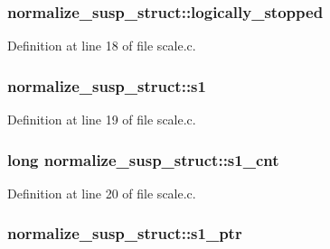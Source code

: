 \subsubsection[{\texorpdfstring{logically\+\_\+stopped}{logically_stopped}}]{ normalize\+\_\+susp\+\_\+struct\+::logically\+\_\+stopped}\hypertarget{structnormalize__susp__struct_a1fe93aa176088fc7f5640f7c9835ea21}{}\label{structnormalize__susp__struct_a1fe93aa176088fc7f5640f7c9835ea21}


Definition at line 18 of file scale.\+c.

\subsubsection[{\texorpdfstring{s1}{s1}}]{ normalize\+\_\+susp\+\_\+struct\+::s1}\hypertarget{structnormalize__susp__struct_a11fb76b27a21d4e4a1752974128351c4}{}\label{structnormalize__susp__struct_a11fb76b27a21d4e4a1752974128351c4}


Definition at line 19 of file scale.\+c.

\subsubsection[{\texorpdfstring{s1\+\_\+cnt}{s1_cnt}}]{\setlength{\rightskip}{0pt plus 5cm}long normalize\+\_\+susp\+\_\+struct\+::s1\+\_\+cnt}\hypertarget{structnormalize__susp__struct_a98562f537c1ef7b0456553700354b5d0}{}\label{structnormalize__susp__struct_a98562f537c1ef7b0456553700354b5d0}


Definition at line 20 of file scale.\+c.

\subsubsection[{\texorpdfstring{s1\+\_\+ptr}{s1_ptr}}]{ normalize\+\_\+susp\+\_\+struct\+::s1\+\_\+ptr}\hypertarget{structnormalize__susp__struct_ae47eebb4d58f3e1643c5ad1223498597}{}\label{structnormalize__susp__struct_ae47eebb4d58f3e1643c5ad1223498597}


